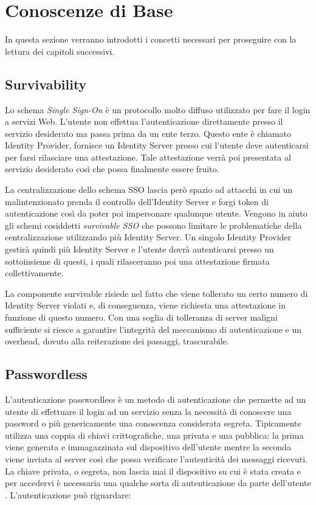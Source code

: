 \chapter{Conoscenze di Base}
\label{conoscenze}

In questa sezione verranno introdotti i concetti necessari per proseguire con la lettura dei capitoli successivi. 

\section{Survivability}
\label{surviv}

Lo schema \emph{Single Sign-On} è un protocollo molto diffuso utilizzato per fare il login a servizi Web. L'utente non effettua l'autenticazione direttamente presso il servizio desiderato ma passa prima da un ente terzo. Questo ente è chiamato Identity Provider, fornisce un Identity Server presso cui l'utente deve autenticarsi per farsi rilasciare una attestazione. Tale attestazione verrà poi presentata al servizio desiderato così che possa finalmente essere fruito. 

La centralizzazione dello schema SSO lascia però spazio ad attacchi in cui un malintenzionato prenda il controllo dell'Identity Server e forgi token di autenticazione così da poter poi impersonare qualunque utente. Vengono in aiuto gli schemi cosiddetti \emph{survivable SSO} che possono limitare le problematiche della centralizzazione utilizzando più Identity Server. Un singolo Identity Provider gestirà quindi più Identity Server e l'utente dovrà autenticarsi presso un sottoinsieme di questi, i quali rilasceranno poi una attestazione firmata collettivamente. 

La componente survivable risiede nel fatto che viene tollerato un certo numero di Identity Server violati e, di conseguenza, viene richiesta una attestazione in funzione di questo numero. Con una soglia di tolleranza di server maligni sufficiente si riesce a garantire l'integrità del meccanismo di autenticazione e un overhead, dovuto alla reiterazione dei passaggi, trascurabile.

\section{Passwordless}
\label{passwordless}

L'autenticazione passwordless è un metodo di autenticazione che permette ad un utente di effettuare il login ad un servizio senza la necessità di conoscere una password o più genericamente una conoscenza considerata segreta. Tipicamente utilizza una coppia di chiavi crittografiche, una privata e una pubblica: la prima viene generata e immagazzinata sul dispositivo dell'utente mentre la seconda viene inviata al server così che possa verificare l'autenticità dei messaggi ricevuti. La chiave privata, o segreta, non lascia mai il dispositivo su cui è stata creata e per accedervi è necessaria una qualche sorta di autenticazione da parte dell'utente \cite{wiki:passwordless}. L'autenticazione può riguardare:

